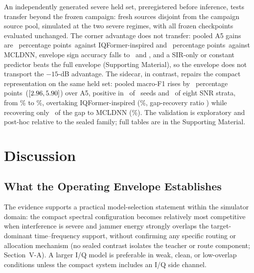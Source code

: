 \documentclass[letterpaper,journal]{IEEEtran}
\newcommand{\pp}{percentage points}
\begin{document}
An independently generated severe held set, preregistered before inference,
tests transfer beyond the frozen campaign: fresh sources disjoint from the
campaign source pool, simulated at the two severe regimes, with all frozen
checkpoints evaluated unchanged. The corner advantage does not transfer:
pooled A5 gains are \SevereTransferGainIqformer\ \pp\ against
IQFormer-inspired and \SevereTransferGainMcldnn\ \pp\ against MCLDNN,
envelope sign accuracy falls to \SevereTransferSignAccIqformer\ and
\SevereTransferSignAccMcldnn, and a SIR-only or constant predictor beats the
full envelope (Supporting Material), so the envelope does not transport the
$-15$-dB advantage. The sidecar, in contrast, repairs the compact
representation on the same held set: pooled macro-F1 rises by
\SevereRepairDiff\ \pp\ ($[2.96,5.90]$) over
A5, positive in \SevereRepairPositiveSeeds\ of \ProtocolSeedCount\ seeds and
\SevereRepairPositiveSnrStrata\ of eight SNR strata, from
\SevereRepairLevelAFive\% to \SevereRepairLevelSidecar\%, overtaking
IQFormer-inspired (\SevereRepairLevelIqformer\%, gap-recovery ratio
\SevereRepairGapRecoveryIqformer) while recovering only
\SevereRepairGapRecoveryMcldnn\ of the gap to MCLDNN
(\SevereRepairLevelMcldnn\%). The validation is exploratory and post-hoc
relative to the sealed family; full tables are in the Supporting Material.

\section{Discussion}
\subsection{What the Operating Envelope Establishes}
The evidence supports a practical model-selection statement within the
simulator domain: the compact spectral configuration becomes relatively most
competitive when interference is severe and jammer energy strongly overlaps
the target-dominant time--frequency support, without confirming any specific
routing or allocation mechanism (no sealed contrast isolates the teacher or
route component; Section~V-A). A larger I/Q model is preferable in weak,
clean, or low-overlap conditions unless the compact system includes an I/Q
side channel.
\end{document}
